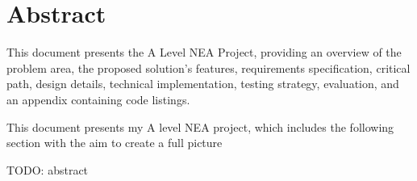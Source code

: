 \chapter{Abstract}

This document presents the A Level NEA Project, providing an overview of the problem area, the proposed solution's features, requirements specification, critical path, design details, technical implementation, testing strategy, evaluation, and an appendix containing code listings. \cite{einstein}


This document presents my A level NEA project, which includes the following section with the aim to create a full picture


TODO: abstract